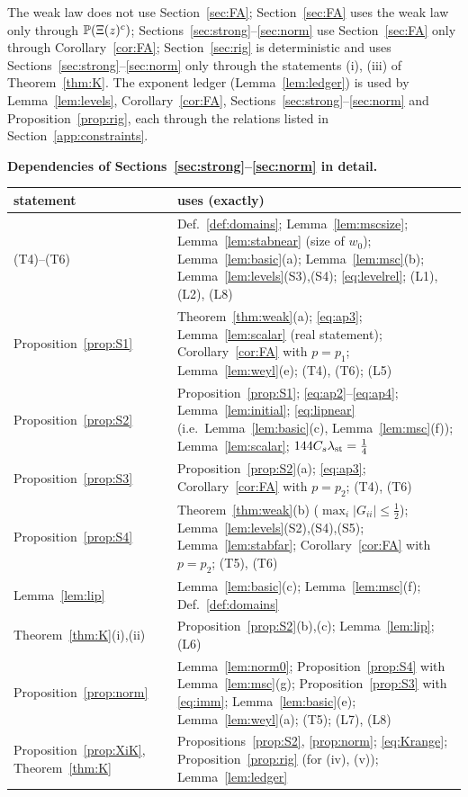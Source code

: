 \noindent The weak law does not use Section~\ref{sec:FA}; Section~\ref{sec:FA} uses the weak law only through $\mathbb{P}(\Xi(z)^c)$; Sections~\ref{sec:strong}--\ref{sec:norm} use Section~\ref{sec:FA} only through Corollary~\ref{cor:FA}; Section~\ref{sec:rig} is deterministic and uses Sections~\ref{sec:strong}--\ref{sec:norm} only through the statements (i), (iii) of Theorem~\ref{thm:K}.
The exponent ledger (Lemma~\ref{lem:ledger}) is used by Lemma~\ref{lem:levels}, Corollary~\ref{cor:FA}, Sections~\ref{sec:strong}--\ref{sec:norm} and Proposition~\ref{prop:rig}, each through the relations listed in Section~\ref{app:constraints}.

\medskip\noindent\textbf{Dependencies of Sections~\ref{sec:strong}--\ref{sec:norm} in detail.}
\begin{center}
\renewcommand{\arraystretch}{1.12}\small
\begin{tabular}{|p{}|p{}|}
\hline
statement & uses (exactly)\\\hline
(T4)--(T6) & Def.~\ref{def:domains}; Lemma~\ref{lem:mscsize}; Lemma~\ref{lem:stabnear} (size of $w_0$); Lemma~\ref{lem:basic}(a); Lemma~\ref{lem:msc}(b); Lemma~\ref{lem:levels}(S3),(S4); \eqref{eq:levelrel}; (L1), (L2), (L8)\\
Proposition~\ref{prop:S1} & Theorem~\ref{thm:weak}(a); \eqref{eq:ap3}; Lemma~\ref{lem:scalar} (real statement); Corollary~\ref{cor:FA} with $p=p_1$; Lemma~\ref{lem:weyl}(e); (T4), (T6); (L5)\\
Proposition~\ref{prop:S2} & Proposition~\ref{prop:S1}; \eqref{eq:ap2}--\eqref{eq:ap4}; Lemma~\ref{lem:initial}; \eqref{eq:lipnear} (i.e.\ Lemma~\ref{lem:basic}(c), Lemma~\ref{lem:msc}(f)); Lemma~\ref{lem:scalar}; $144C_s\lambda_{\rm st}=\frac14$\\
Proposition~\ref{prop:S3} & Proposition~\ref{prop:S2}(a); \eqref{eq:ap3}; Corollary~\ref{cor:FA} with $p=p_2$; (T4), (T6)\\
Proposition~\ref{prop:S4} & Theorem~\ref{thm:weak}(b) ($\max_i|G_{ii}|\le\frac12$); Lemma~\ref{lem:levels}(S2),(S4),(S5); Lemma~\ref{lem:stabfar}; Corollary~\ref{cor:FA} with $p=p_2$; (T5), (T6)\\
Lemma~\ref{lem:lip} & Lemma~\ref{lem:basic}(c); Lemma~\ref{lem:msc}(f); Def.~\ref{def:domains}\\
Theorem~\ref{thm:K}(i),(ii) & Proposition~\ref{prop:S2}(b),(c); Lemma~\ref{lem:lip}; (L6)\\
Proposition~\ref{prop:norm} & Lemma~\ref{lem:norm0}; Proposition~\ref{prop:S4} with Lemma~\ref{lem:msc}(g); Proposition~\ref{prop:S3} with \eqref{eq:imm}; Lemma~\ref{lem:basic}(e); Lemma~\ref{lem:weyl}(a); (T5); (L7), (L8)\\
Proposition~\ref{prop:XiK}, Theorem~\ref{thm:K} & Propositions~\ref{prop:S2}, \ref{prop:norm}; \eqref{eq:Krange}; Proposition~\ref{prop:rig} (for (iv), (v)); Lemma~\ref{lem:ledger}\\\hline
\end{tabular}
\end{center}


